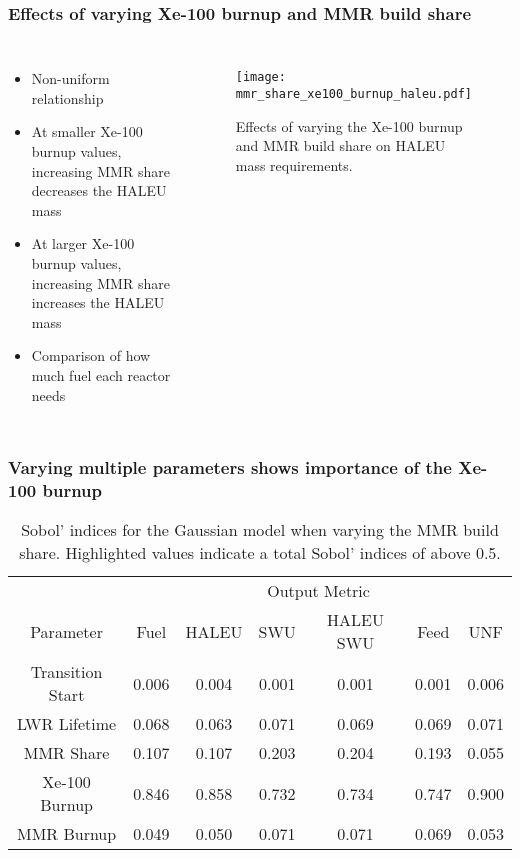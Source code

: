\begin{frame}
    \frametitle{Effects of varying Xe-100 burnup and MMR build share}
    \begin{columns}

        \column[t]{4cm}
        \begin{itemize}
            \item Non-uniform relationship
            \item At smaller Xe-100 burnup values, increasing MMR 
                  share decreases the HALEU mass
            \item At larger Xe-100 burnup values, increasing MMR share 
                  increases the HALEU mass
            \item Comparison of how much fuel each reactor needs
        \end{itemize}

    \column[t]{6cm}
    \vspace{-1cm}
    \begin{figure}
        \centering 
            \texttt{[image: mmr\_share\_xe100\_burnup\_haleu.pdf]}
            \caption{Effects of varying the Xe-100 burnup and MMR build 
            share on HALEU mass requirements. }
            \label{fig:mmr_share_xe100_bu}
    \end{figure}

\end{columns}
\end{frame}

\begin{frame}
    \frametitle{Varying multiple parameters shows importance of the 
    Xe-100 burnup}
    \begin{table}[h!]
        \centering
        \caption{Sobol' indices for the Gaussian model when varying the MMR 
        build share. Highlighted 
        values indicate a total Sobol' indices of above 0.5.}
        \label{tab:s7_sobol_mmr_gaussian}
        \begin{tabular}{c c c c c c c }
            \hline
            & \multicolumn{6}{c}{Output Metric} \\
            Parameter & Fuel & HALEU & SWU & HALEU SWU & Feed & UNF\\
            \hline
            Transition Start & 0.006 & 0.004 & 0.001 &
                               0.001 & 0.001 & 0.006\\
            LWR Lifetime & 0.068 & 0.063 & 0.071 &
                           0.069 & 0.069 & 0.071\\
            MMR Share & 0.107 & 0.107 & 0.203 &
                              0.204 & 0.193 & 0.055\\
            Xe-100 Burnup & \cellcolor{green!25}0.846 & \cellcolor{green!25}0.858 & \cellcolor{green!25}0.732 &
            \cellcolor{green!25}0.734 & \cellcolor{green!25}0.747 & \cellcolor{green!25}0.900\\
            MMR Burnup & 0.049 & 0.050 & 0.071 &
                         0.071 & 0.069 & 0.053\\
            \hline        
        \end{tabular}
    \end{table}
\end{frame}

